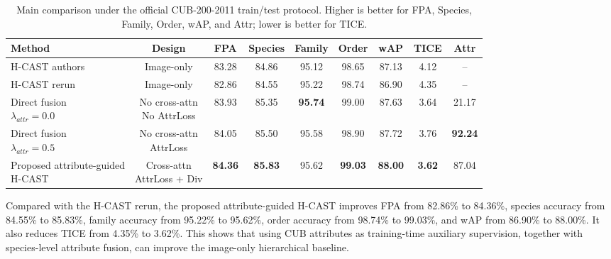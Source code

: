 \begin{table}[t]
    \centering
    \caption{Main comparison under the official CUB-200-2011 train/test protocol. Higher is better for FPA, Species, Family, Order, wAP, and Attr; lower is better for TICE.}
    \label{tab:main_results}
    \small
    \setlength{\tabcolsep}{3pt}
    \renewcommand{\arraystretch}{1.12}
    \begin{adjustbox}{max width=\textwidth}
    \begin{tabular}{@{}lcccccccc@{}}
        \hline
        \textbf{Method} & \textbf{Design} & \textbf{FPA} & \textbf{Species} & \textbf{Family} & \textbf{Order} & \textbf{wAP} & \textbf{TICE} & \textbf{Attr} \\
        \hline

        H-CAST authors
        & Image-only
        & 83.28 & 84.86 & 95.12 & 98.65 & 87.13 & 4.12 & -- \\

        H-CAST rerun
        & Image-only
        & 82.86 & 84.55 & 95.22 & 98.74 & 86.90 & 4.35 & -- \\

        \makecell[l]{Direct fusion\\\(\lambda_{attr}=0.0\)}
        & \makecell{No cross-attn\\No AttrLoss}
        & 83.93 & 85.35 & \textbf{95.74} & 99.00 & 87.63 & 3.64 & 21.17 \\

        \makecell[l]{Direct fusion\\\(\lambda_{attr}=0.5\)}
        & \makecell{No cross-attn\\AttrLoss}
        & 84.05 & 85.50 & 95.58 & 98.90 & 87.72 & 3.76 & \textbf{92.24} \\

        \makecell[l]{Proposed attribute-guided\\H-CAST}
        & \makecell{Cross-attn\\AttrLoss + Div}
        & \textbf{84.36} & \textbf{85.83} & 95.62 & \textbf{99.03} & \textbf{88.00} & \textbf{3.62} & 87.04 \\

        \hline
    \end{tabular}
    \end{adjustbox}
\end{table}

Compared with the H-CAST rerun, the proposed attribute-guided H-CAST improves FPA from 82.86\% to 84.36\%, species accuracy from 84.55\% to 85.83\%, family accuracy from 95.22\% to 95.62\%, order accuracy from 98.74\% to 99.03\%, and wAP from 86.90\% to 88.00\%. It also reduces TICE from 4.35\% to 3.62\%. This shows that using CUB attributes as training-time auxiliary supervision, together with species-level attribute fusion, can improve the image-only hierarchical baseline.

